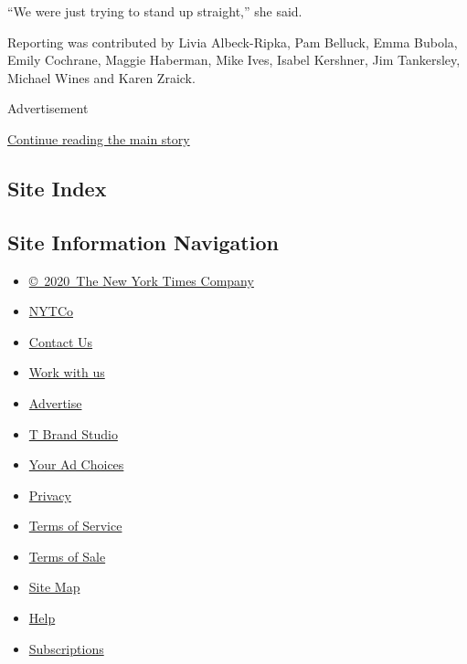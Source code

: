 ``We were just trying to stand up straight,'' she said.

Reporting was contributed by Livia Albeck-Ripka, Pam Belluck, Emma
Bubola, Emily Cochrane, Maggie Haberman, Mike Ives, Isabel Kershner, Jim
Tankersley, Michael Wines and Karen Zraick.

Advertisement

\protect\hyperlink{after-bottom}{Continue reading the main story}

\hypertarget{site-index}{%
\subsection{Site Index}\label{site-index}}

\hypertarget{site-information-navigation}{%
\subsection{Site Information
Navigation}\label{site-information-navigation}}

\begin{itemize}
\tightlist
\item
  \href{https://help.nytimes3xbfgragh.onion/hc/en-us/articles/115014792127-Copyright-notice}{©~2020~The
  New York Times Company}
\end{itemize}

\begin{itemize}
\tightlist
\item
  \href{https://www.nytco.com/}{NYTCo}
\item
  \href{https://help.nytimes3xbfgragh.onion/hc/en-us/articles/115015385887-Contact-Us}{Contact
  Us}
\item
  \href{https://www.nytco.com/careers/}{Work with us}
\item
  \href{https://nytmediakit.com/}{Advertise}
\item
  \href{http://www.tbrandstudio.com/}{T Brand Studio}
\item
  \href{https://www.nytimes3xbfgragh.onion/privacy/cookie-policy\#how-do-i-manage-trackers}{Your
  Ad Choices}
\item
  \href{https://www.nytimes3xbfgragh.onion/privacy}{Privacy}
\item
  \href{https://help.nytimes3xbfgragh.onion/hc/en-us/articles/115014893428-Terms-of-service}{Terms
  of Service}
\item
  \href{https://help.nytimes3xbfgragh.onion/hc/en-us/articles/115014893968-Terms-of-sale}{Terms
  of Sale}
\item
  \href{https://spiderbites.nytimes3xbfgragh.onion}{Site Map}
\item
  \href{https://help.nytimes3xbfgragh.onion/hc/en-us}{Help}
\item
  \href{https://www.nytimes3xbfgragh.onion/subscription?campaignId=37WXW}{Subscriptions}
\end{itemize}
